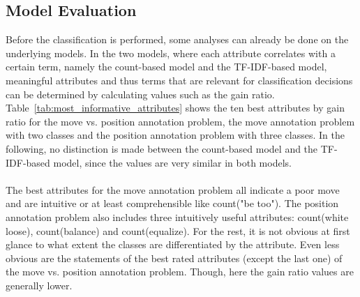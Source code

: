 \documentclass[article,type=msc,colorback,accentcolor=tud7b]{tudthesis}
\begin{document}
  \subsection{Model Evaluation}    
    Before the classification is performed, some analyses can already be done on the underlying models. In the two models, where each attribute correlates with a certain term, namely the count-based model and the TF-IDF-based model, meaningful attributes and thus terms that are relevant for classification decisions can be determined by calculating values such as the gain ratio. Table~\ref{tab:most_informative_attributes} shows the ten best attributes by gain ratio for the move vs. position annotation problem, the move annotation problem with two classes and the position annotation problem with three classes. In the following, no distinction is made between the count-based model and the TF-IDF-based model, since the values are very similar in both models. \\\\
    The best attributes for the move annotation problem all indicate a poor move and are intuitive or at least comprehensible like count("be too"). The position annotation problem also includes three intuitively useful attributes: count(white loose), count(balance) and count(equalize). For the rest, it is not obvious at first glance to what extent the classes are differentiated by the attribute. Even less obvious are the statements of the best rated attributes (except the last one) of the move vs. position annotation problem. Though, here the gain ratio values are generally lower.
    
\end{document}

